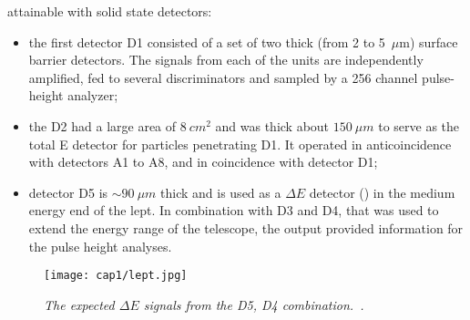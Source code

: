 attainable with solid state detectors:
\begin{itemize}
\item the first detector D1 consisted of a set of two thick (from 2 to
  5~$\mu$m) surface barrier detectors. The signals from each of the
  units are independently amplified, fed to several discriminators and
  sampled by a 256 channel pulse-height analyzer;
\item the D2 had a large area of $8~cm^2$ and was thick about
  $150~\mu m$ to serve as the total E detector for particles
  penetrating D1. It operated in anticoincidence with detectors A1 to
  A8, and in coincidence with detector D1;
\item detector D5 is $\sim 90~\mu m$ thick and is used as a $\Delta E$
  detector () in the medium energy end of the \gls{lept}. In
  combination with D3 and D4, that was used to extend the energy range
  of the telescope, the output provided information for the pulse
  height analyses.
\end{itemize}
\begin{figure}[!htbp]
  \centering
  \texttt{[image: cap1/lept.jpg]}
  \caption{\textit{The expected $\Delta E$ signals from the D5, D4
      combination.~\cite{}.}}\label{lept}
\end{figure}
























